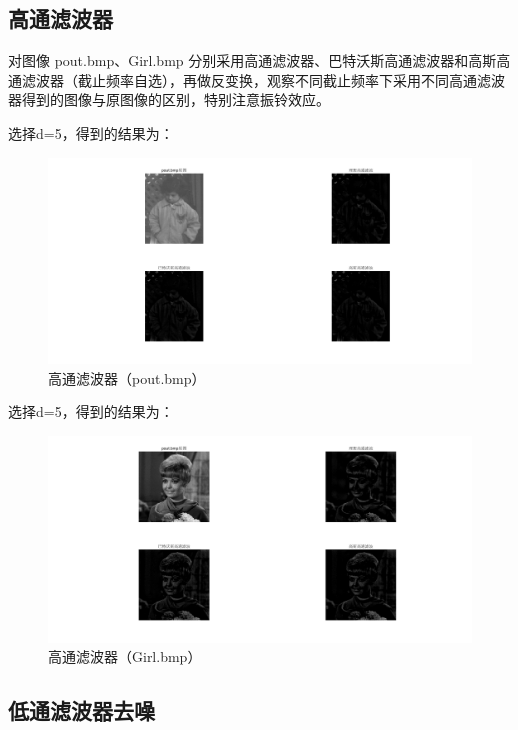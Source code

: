 \documentclass{ctexart}
\begin{document}
\subsection{\hei 高通滤波器}
对图像 pout.bmp、Girl.bmp 分别采用高通滤波器、巴特沃斯高通滤波器和高斯高
通滤波器（截止频率自选），再做反变换，观察不同截止频率下采用不同高通滤波
器得到的图像与原图像的区别，特别注意振铃效应。
\par 选择d=5，得到的结果为：
\begin{figure}[H]
    \centering
    \includegraphics[scale=0.35]{4_7_1.png}
    \caption{高通滤波器（pout.bmp）}
\end{figure}
\par 选择d=5，得到的结果为：
\begin{figure}[H]
    \centering
    \includegraphics[scale=0.35]{4_7_2.png}
    \caption{高通滤波器（Girl.bmp）}
\end{figure}
\subsection{\hei 低通滤波器去噪}
\end{document}
